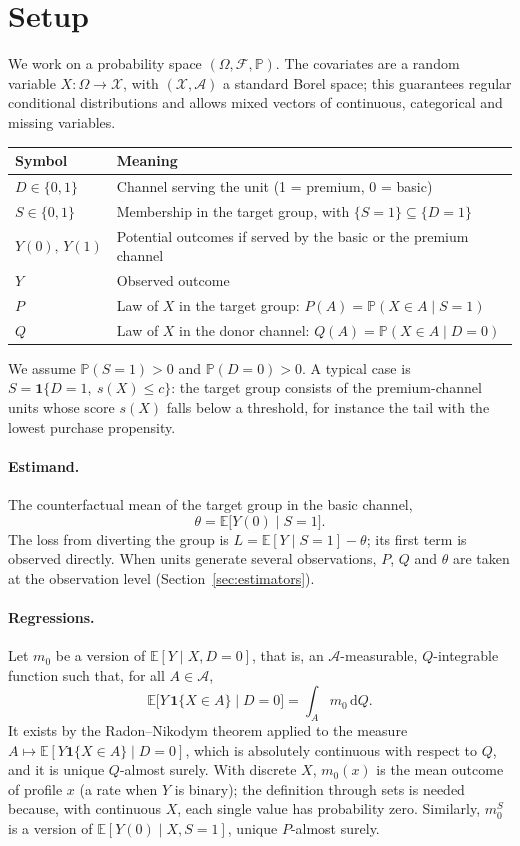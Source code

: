 \documentclass[twoside,11pt]{article}
\newcommand{\E}{\mathbb{E}}
\newcommand{\PP}{\mathbb{P}}
\newcommand{\ind}{\mathbf{1}}
\newcommand{\X}{\mathcal{X}}
\newcommand{\A}{\mathcal{A}}
\newcommand{\dd}{\,\mathrm{d}}
\theoremstyle{plain}
\theoremstyle{definition}
\begin{document}
\section{Setup}\label{sec:setup}

We work on a probability space $(\Omega,\mathcal F,\PP)$. The covariates are a random variable $X\colon\Omega\to\X$, with $(\X,\A)$ a standard Borel space; this guarantees regular conditional distributions and allows mixed vectors of continuous, categorical and missing variables.

\begin{center}
\begin{tabular}{@{}ll@{}}
\toprule
Symbol & Meaning \\
\midrule
$D\in\{0,1\}$ & Channel serving the unit (1 = premium, 0 = basic) \\
$S\in\{0,1\}$ & Membership in the target group, with $\{S=1\}\subseteq\{D=1\}$ \\
$Y(0),\,Y(1)$ & Potential outcomes if served by the basic or the premium channel \\
$Y$ & Observed outcome \\
$P$ & Law of $X$ in the target group: $P(A)=\PP(X\in A\mid S=1)$ \\
$Q$ & Law of $X$ in the donor channel: $Q(A)=\PP(X\in A\mid D=0)$ \\
\bottomrule
\end{tabular}
\end{center}

We assume $\PP(S=1)>0$ and $\PP(D=0)>0$. A typical case is $S=\ind\{D=1,\ s(X)\le c\}$: the target group consists of the premium-channel units whose score $s(X)$ falls below a threshold, for instance the tail with the lowest purchase propensity.

\paragraph{Estimand.} The counterfactual mean of the target group in the basic channel,
\[
\theta=\E\bigl[Y(0)\mid S=1\bigr].
\]
The loss from diverting the group is $L=\E[Y\mid S=1]-\theta$; its first term is observed directly. When units generate several observations, $P$, $Q$ and $\theta$ are taken at the observation level (Section~\ref{sec:estimators}).

\paragraph{Regressions.} Let $m_0$ be a version of $\E[Y\mid X,D=0]$, that is, an $\A$-measurable, $Q$-integrable function such that, for all $A\in\A$,
\[
\E\bigl[Y\,\ind\{X\in A\}\mid D=0\bigr]=\int_A m_0\dd Q .
\]
It exists by the Radon--Nikodym theorem applied to the measure $A\mapsto\E[Y\ind\{X\in A\}\mid D=0]$, which is absolutely continuous with respect to $Q$, and it is unique $Q$-almost surely. With discrete $X$, $m_0(x)$ is the mean outcome of profile $x$ (a rate when $Y$ is binary); the definition through sets is needed because, with continuous $X$, each single value has probability zero. Similarly, $m_0^S$ is a version of $\E[Y(0)\mid X,S=1]$, unique $P$-almost surely.
\end{document}
